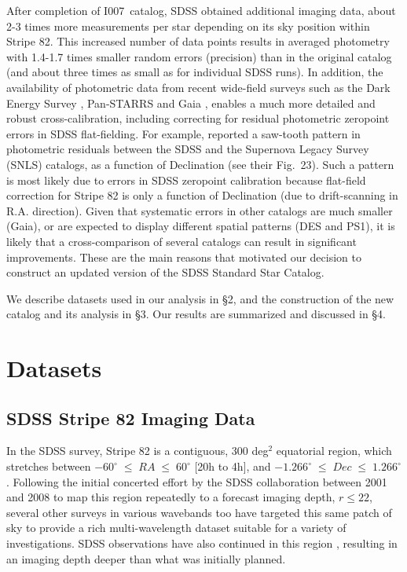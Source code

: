 \documentclass[fleqn,usenatbib]{mnras}
\newcommand{\pOc}{\hbox{I007 catalog}}
\begin{document}
After completion of \pOc, SDSS obtained additional imaging data, about 2-3 times more measurements 
per star depending on its sky position within Stripe 82. This increased number of data points results in averaged photometry with
1.4-1.7 times smaller random errors (precision) than in the original catalog (and about three times as small as for individual 
SDSS runs). In addition, the availability of photometric data from recent wide-field surveys such as the 
Dark Energy Survey \citep[DES,][]{2016MNRAS.460.1270D}, Pan-STARRS \citep[PS1,][]{2010SPIE.7733E..0EK} and Gaia \citep{GaiaCollab2018b}, enables a much more detailed and robust cross-calibration, including
correcting for residual photometric zeropoint errors in SDSS flat-fielding. For example, \cite{2013A&A...552A.124B}
reported a saw-tooth pattern in photometric residuals between the SDSS and the Supernova Legacy Survey (SNLS) catalogs, as a function of Declination (see their Fig.~23). Such a pattern is most likely due to errors in SDSS zeropoint calibration because
flat-field correction for Stripe 82 is only a function of Declination (due to drift-scanning in R.A. direction). 
Given that systematic errors in other catalogs are much smaller (Gaia), or are expected to display different 
spatial patterns (DES and PS1), it is likely that a cross-comparison of several catalogs can result in
significant improvements. These are the main reasons that motivated our decision to construct an updated version of the 
SDSS Standard Star Catalog. 

We describe datasets used in our analysis in \S2, and the construction of the new catalog and its analysis in \S3. 
Our results are summarized and discussed in \S4. 


\section{Datasets} \label{sec:data}

\subsection{SDSS Stripe 82 Imaging Data} \label{ssec:s82}

In the SDSS survey, Stripe 82 is a contiguous, 300 deg$^2$ equatorial region, which stretches between $-60^{\circ}\;\leq\;RA\;\leq\;60^{\circ}$ [20h to 4h], and $-1.266^{\circ}\;\leq\;Dec\;\leq\;1.266^{\circ}$. Following the initial concerted effort by the SDSS collaboration between 2001 and 2008 to map this region repeatedly to a forecast imaging depth, $r \leq 22$, several other surveys in various wavebands too have targeted this same patch of sky to provide a rich multi-wavelength dataset suitable for a variety of investigations. SDSS observations have also continued in this region \citep[e.g., the SDSS-II search for supernovae,][]{2008AJ....135..338F}, resulting in an imaging depth deeper than what was initially planned.  
\end{document}
